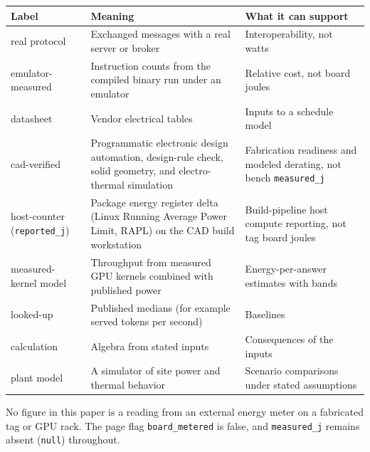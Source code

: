 \documentclass[10pt,letterpaper]{article}
\newcounter{none}
\begin{document}
{\def\LTcaptype{none} %
{\footnotesize\setlength{\tabcolsep}{3.8pt}\renewcommand{\arraystretch}{1.15}
\begin{longtable}[]{@{}
  >{\raggedright\arraybackslash}p{}
  >{\raggedright\arraybackslash}p{}
  >{\raggedright\arraybackslash}p{}@{}}
\toprule\noalign{}
\begin{minipage}[b]{\linewidth}\raggedright
\textbf{Label}
\end{minipage} & \begin{minipage}[b]{\linewidth}\raggedright
\textbf{Meaning}
\end{minipage} & \begin{minipage}[b]{\linewidth}\raggedright
\textbf{What it can support}
\end{minipage} \\
\midrule\noalign{}
\endhead
\bottomrule\noalign{}
\endlastfoot
real protocol & Exchanged messages with a real server or broker &
Interoperability, not watts \\
emulator-measured & Instruction counts from the compiled binary run
under an emulator & Relative cost, not board joules \\
datasheet & Vendor electrical tables & Inputs to a schedule model \\
cad-verified & Programmatic electronic design automation, design-rule
check, solid geometry, and electro-thermal simulation & Fabrication
readiness and modeled derating, not bench \texttt{measured\_j} \\
host-counter (\texttt{reported\_j}) & Package energy register delta
(Linux Running Average Power Limit, RAPL) on the CAD build workstation &
Build-pipeline host compute reporting, not tag board joules \\
measured-kernel model & Throughput from measured GPU kernels combined
with published power & Energy-per-answer estimates with bands \\
looked-up & Published medians (for example served tokens per second) &
Baselines \\
calculation & Algebra from stated inputs & Consequences of the inputs \\
plant model & A simulator of site power and thermal behavior & Scenario
comparisons under stated assumptions \\
\end{longtable}
}
}

No figure in this paper is a reading from an external energy meter on a
fabricated tag or GPU rack. The page flag \texttt{board\_metered} is
false, and \texttt{measured\_j} remains absent (\texttt{null})
throughout.
\end{document}
